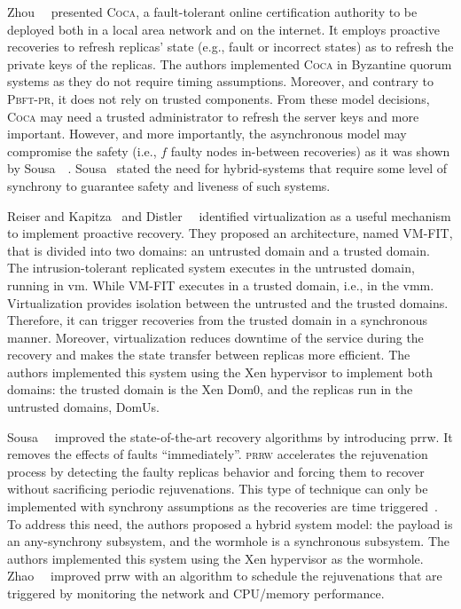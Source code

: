 Zhou~\etal{}~\cite{Zhou:2002} presented \textsc{Coca}, a fault-tolerant online certification authority to be deployed both in a local area network and on the internet.
It employs proactive recoveries to refresh replicas' state (e.g., fault or incorrect states) as to refresh the private keys of the replicas.
The authors implemented \textsc{Coca} in Byzantine quorum systems as they do not require timing assumptions.
Moreover, and contrary to \textsc{Pbft-pr}, it does not rely on trusted components.
From these model decisions, \textsc{Coca} may need a trusted administrator to refresh the server keys and more important.
However, and more importantly, the asynchronous model may compromise the safety (i.e., $f$ faulty nodes in-between recoveries) as it was shown by Sousa~\etal{}~\cite{Sousa:2007}. 
Sousa~\etal{} stated the need for hybrid-systems that require some level of synchrony to guarantee safety and liveness of such systems.


Reiser and Kapitza~\cite{Reiser:2007} and Distler~\etal{}~\cite{Distler:2008} identified virtualization as a useful mechanism to implement proactive recovery. 
They proposed an architecture, named \textsc{VM-FIT}, that is divided into two domains: an untrusted domain and a trusted domain.
The intrusion-tolerant replicated system executes in the untrusted domain, running in \gls{vm}. 
While \textsc{VM-FIT} executes in a trusted domain, i.e., in the \gls{vmm}. 
Virtualization provides isolation between the untrusted and the trusted domains. 
Therefore, it can trigger recoveries from the trusted domain in a synchronous manner. 
Moreover, virtualization reduces downtime of the service during the recovery and makes the state transfer between replicas more efficient. 
The authors implemented this system using the Xen hypervisor to implement both domains: the trusted domain is the Xen Dom0, and the replicas run in the untrusted domains, DomUs.

Sousa~\etal{}~\cite{Sousa:2010} improved the state-of-the-art recovery algorithms by introducing \gls{prrw}. 
It removes the effects of faults ``immediately''. 
\textsc{\gls{prrw}} accelerates the rejuvenation process by detecting the faulty replicas behavior and forcing them to recover without sacrificing periodic rejuvenations. 
This type of technique can only be implemented with synchrony assumptions as the recoveries are time triggered~\cite{Sousa:2005}. 
To address this need, the authors proposed a hybrid system model: the payload is an any-synchrony subsystem, and the wormhole is a synchronous subsystem. 
The authors implemented this system using the Xen hypervisor as the wormhole. 
Zhao~\etal{}~\cite{Zhao:2012} improved \gls{prrw} with an algorithm to schedule the rejuvenations that are triggered by monitoring the network and CPU/memory performance.


